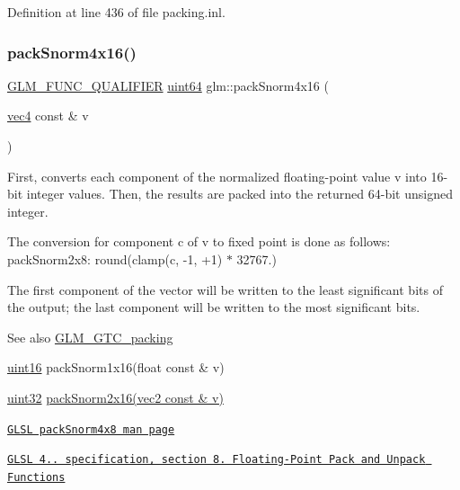 Definition at line 436 of file packing.\+inl.

\mbox{\label{group__gtc__packing_ga9b237d7c66b7a71964e6d1f4dc06539f}} 
\subsubsection{\texorpdfstring{pack\+Snorm4x16()}{packSnorm4x16()}}
{\footnotesize\ttfamily \hyperlink{setup_8hpp_a33fdea6f91c5f834105f7415e2a64407}{G\+L\+M\+\_\+\+F\+U\+N\+C\+\_\+\+Q\+U\+A\+L\+I\+F\+I\+ER} \hyperlink{group__gtc__type__precision_gae3632bf9b37da66233d78930dd06378a}{uint64} glm\+::pack\+Snorm4x16 (\begin{DoxyParamCaption}\item[{\hyperlink{group__core__types_ga5881b1b022d7fd1b7218f5916532dd02}{vec4} const \&}]{v }\end{DoxyParamCaption})}

First, converts each component of the normalized floating-\/point value v into 16-\/bit integer values. Then, the results are packed into the returned 64-\/bit unsigned integer.

The conversion for component c of v to fixed point is done as follows\+: pack\+Snorm2x8\+: round(clamp(c, -\/1, +1) $\ast$ 32767.)

The first component of the vector will be written to the least significant bits of the output; the last component will be written to the most significant bits.

\begin{DoxySeeAlso}{See also}
\hyperlink{group__gtc__packing}{G\+L\+M\+\_\+\+G\+T\+C\+\_\+packing} 

\hyperlink{group__gtc__type__precision_gad8c2939e1fdd8e5828b31d95c52255d5}{uint16} pack\+Snorm1x16(float const \& v) 

\hyperlink{group__gtc__type__precision_ga202b6a53c105fcb7e531f9b443518451}{uint32} \hyperlink{group__core__func__packing_ga0c8005de240d6c4ca3d16c7bee25c622}{pack\+Snorm2x16(vec2 const \& v)} 

\href{http://www.opengl.org/sdk/docs/manglsl/xhtml/packSnorm4x8.xml}{\tt G\+L\+SL pack\+Snorm4x8 man page} 

\href{http://www.opengl.org/registry/doc/GLSLangSpec.4.20.8.pdf}{\tt G\+L\+SL 4.. specification, section 8. Floating-\/\+Point Pack and Unpack Functions} 
\end{DoxySeeAlso}


